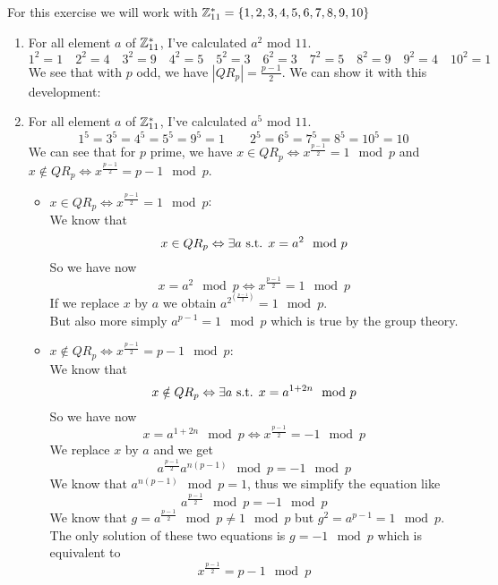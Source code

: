 \begin{solution}
For this exercise we will work with $\mathbb{Z}_{11}^* = \{1,2,3,4,5,6,7,8,9,10\}$
\begin{enumerate}
    \item 
		For all element $a$ of $\mathbb{Z}_{11}^*$, I've calculated $a^2$ mod $11$.
		$$1^2 = 1 \quad 2^2 = 4 \quad 3^2 = 9 \quad 4^2 = 5 \quad 5^2 = 3 \quad 6^2 = 3 \quad 7^2 = 5 \quad 8^2 = 9 \quad 9^2 = 4 \quad 10^2 = 1$$
		We see that with $p$ odd, we have $\left|QR_p\right| = \frac{p-1}{2}$. We can show it with this development:
		
	\item
		For all element $a$ of $\mathbb{Z}_{11}^*$, I've calculated $a^5$ mod $11$.
		$$1^5 = 3^5 = 4^5 = 5^5 = 9^5 = 1 \qquad 2^5 = 6^5 = 7^5 = 8^5 = 10^5 = 10$$
		We can see that for $p$ prime, we have $x \in QR_p \Leftrightarrow x^{\frac{p-1}{2}} = 1 \mod p$ and  $x \notin QR_p \Leftrightarrow x^{\frac{p-1}{2}} = p-1 \mod p$.
		\begin{itemize}
			\item $x \in QR_p \Leftrightarrow x^{\frac{p-1}{2}} = 1 \mod p$:\\
			We know that $$x \in QR_p \Leftrightarrow \exists a \text{ s.t. } x = a^2 \mod p$$
			So we have now $$x = a^2 \mod p \Leftrightarrow x^{\frac{p-1}{2}} = 1 \mod p$$
			If we replace $x$ by $a$ we obtain $a^{2^{(\frac{p-1}{2})}} = 1 \mod p$.\\ 
			But also more simply $a^{p-1} = 1 \mod p$ which is true by the group theory.
			\item $x \notin QR_p \Leftrightarrow x^{\frac{p-1}{2}} = p-1 \mod p$:\\
			We know that $$x \notin QR_p \Leftrightarrow \exists a \text{ s.t. } x = a^{1+2n} \mod p$$
			So we have now $$x = a^{1+2n} \mod p \Leftrightarrow x^{\frac{p-1}{2}} = -1 \mod p$$
			We replace $x$ by $a$ and we get $$a^{\frac{p-1}{2}} a^{n(p-1)} \mod p = -1 \mod p$$ 
			We know that $ a^{n(p-1)} \mod p = 1$, thus we simplify the equation like $$a^{\frac{p-1}{2}} \mod p = -1 \mod p$$ 
			We know that $g = a^{\frac{p-1}{2}} \mod p \ne 1 \mod p$ but $g^2 = a^{p-1} = 1 \mod p$. The only solution of these two equations is $g = -1 \mod p$ which is equivalent to $$x^{\frac{p-1}{2}} = p-1 \mod p$$
		\end{itemize}
	

\end{enumerate}
\end{solution}
